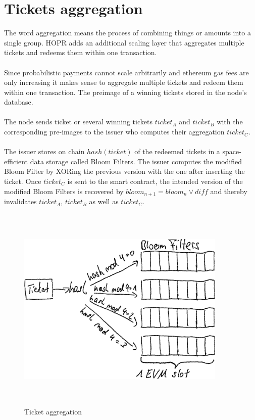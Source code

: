 \section{Tickets aggregation}
The word aggregation means the process of combining things or amounts into a single group. 
HOPR adds an additional scaling layer that aggregates multiple tickets and redeems them within one transaction.
\\~\\ Since probabilistic payments cannot scale arbitrarily and ethereum gas fees are only increasing it makes sense to aggregate multiple tickets and redeem them within one transaction.
The preimage of a winning tickets stored in the node’s database. 
\\~\\ The node sends ticket or several winning tickets $ticket_A$ and $ticket_B$ with the corresponding pre-images to the issuer who computes their aggregation $ticket_C$. 
\\~\\The issuer stores on chain $hash(ticket)$ of the redeemed tickets in a space-efficient data storage called Bloom Filters.
The issuer computes the modified Bloom Filter by XORing the previous version with the one after inserting the ticket.
\newline Once $ticket_C$ is sent to the smart contract, the intended version of the modified Bloom Filters is recovered by $bloom_{n+1} = bloom_n \vee diff$ and thereby invalidates $ticket_A$, $ticket_B$ as well as $ticket_C$.

\begin{figure}[H]
    \centering
    \includegraphics[width=10cm,height=10cm,keepaspectratio]{../yellowpaper/images/ticket_aggregation.png}
    \caption{Ticket aggregation}
    \label{fig:Ticket aggregation}
    \end{figure}
